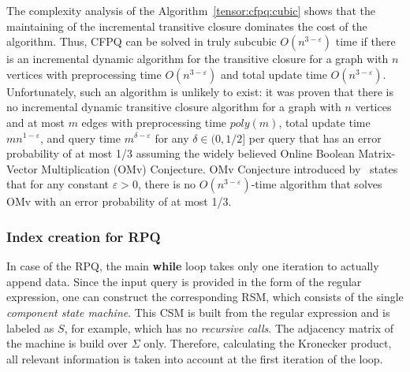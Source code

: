 The complexity analysis of the Algorithm~\ref{tensor:cfpq:cubic} shows that the maintaining of the incremental transitive closure dominates the cost of the algorithm. Thus, CFPQ can be solved in truly subcubic $O(n^{3-\varepsilon})$ time if there is an incremental dynamic algorithm for the transitive closure for a graph with $n$ vertices with preprocessing time $O(n^{3-\varepsilon})$ and total update time $O(n^{3-\varepsilon})$. Unfortunately, such an algorithm is unlikely to exist: it was proven that there is no incremental dynamic transitive closure algorithm for a graph with $n$ vertices and at most $m$ edges with preprocessing time $poly(m)$, total update time $mn^{1-\varepsilon}$, and query time $m^{\delta-\varepsilon}$ for any $\delta \in (0, 1/2]$ per query that has an error probability of at most 1/3 assuming the widely believed Online Boolean Matrix-Vector Multiplication (OMv) Conjecture. OMv Conjecture introduced by~\cite{10.1145/2746539.2746609} states that for any constant $ \varepsilon>0$, there is no $O(n^{3-\varepsilon})$-time algorithm that solves OMv with an error probability of at most 1/3.



\subsubsection{Index creation for RPQ}
In case of the RPQ, the main \textbf{while} loop takes only one iteration to actually append data.
Since the input query is provided in the form of the regular expression, one can construct the corresponding RSM, which consists of the single \textit{component state machine}.
This CSM is built from the regular expression and is labeled as $S$, for example, which has no \textit{recursive calls}.
The adjacency matrix of the machine is build over $\Sigma$ only.
Therefore, calculating the Kronecker product, all relevant information is taken into account at the first iteration of the loop.